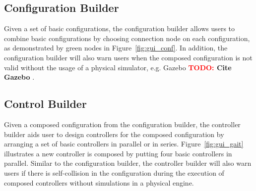 \documentclass[conference]{IEEEtran}
\theoremstyle{definition}
\newcommand{\TODO}[1]{ {\bf \textcolor{red}{TODO:} #1 }}
\begin{document}
\subsection{Configuration Builder}
Given a set of basic configurations, the configuration builder allows users to combine basic configurations by choosing connection node on each configuration, as demonstrated by green nodes in Figure~\ref{fig:gui_conf}. In addition, the configuration builder will also warn users when the composed configuration is not valid without the usage of a physical simulator, e.g. Gazebo
\TODO{Cite Gazebo}.

\subsection{Control Builder}
Given a composed configuration from the configuration builder, the controller builder aids user to design controllers for the composed configuration by arranging a set of basic controllers in parallel or in series. Figure~\ref{fig:gui_gait} illustrates a new controller is composed by putting four basic controllers in parallel. Similar to the configuration builder, the controller builder will also warn users if there is self-collision in the configuration during the execution of composed controllers without simulations in a physical engine.
\end{document}
